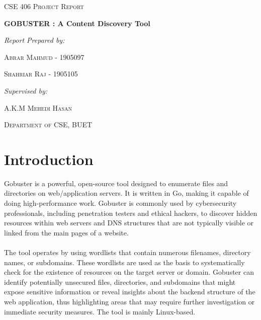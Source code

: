 \documentclass[12 pt]{article}
\begin{document}
\begin{titlepage}
    \centering
    {\scshape\Large CSE 406 Project Report\par}
    \vspace{1.5cm}
    {\huge\bfseries GOBUSTER : A Content Discovery Tool\par}
    \vspace{2cm}
    {\Large\itshape Report Prepared by:\par}
    \vspace{0.25cm}
    {\scshape\Large Abrar Mahmud - 1905097\par} 
    {\scshape\Large Shahriar Raj - 1905105\par} 
    \vspace{2cm}
    {\Large\itshape Supervised by:\par}
    \vspace{0.25cm}
    {\scshape\Large A.K.M Mehedi Hasan\par}
    \vspace{2cm}
    {\scshape\LARGE Department of CSE, BUET \par}
    \vfill
\end{titlepage}

\newpage
\tableofcontents
\newpage

\section{Introduction}
Gobuster is a powerful, open-source tool designed to enumerate files and directories on web/application servers. It is written in Go, making it capable of doing high-performance work. Gobuster is commonly used by cybersecurity professionals, including penetration testers and ethical hackers, to discover hidden resources within web servers and DNS structures that are not typically visible or linked from the main pages of a website. 
\\ \\
The tool operates by using wordlists that contain numerous filenames, directory names, or subdomains. These wordlists are used as the basis to systematically check for the existence of resources on the target server or domain. Gobuster can identify potentially unsecured files, directories, and subdomains that might expose sensitive information or reveal insights about the backend structure of the web application, thus highlighting areas that may require further investigation or immediate security measures. The tool is mainly Linux-based.\\
\end{document}
